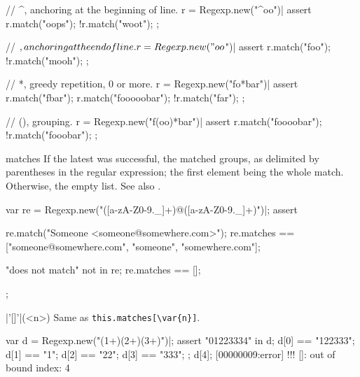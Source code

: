 \begin{urbiscriptapi}
\begin{urbiscript}
// ^, anchoring at the beginning of line.
r = Regexp.new("^oo")|
assert
{
  r.match("oops");
  !r.match("woot");
};

// $, anchoring at the end of line.
r = Regexp.new("oo$")|
assert
{
  r.match("foo");
  !r.match("mooh");
};

// *, greedy repetition, 0 or more.
r = Regexp.new("fo*bar")|
assert
{
  r.match("fbar");
  r.match("fooooobar");
  !r.match("far");
};

// (), grouping.
r = Regexp.new("f(oo)*bar")|
assert
{
  r.match("foooobar");
  !r.match("fooobar");
};
\end{urbiscript}

\item[matches]%
  If the latest  was successful, the matched groups, as
  delimited by parentheses in the regular expression; the first element
  being the whole match.  Otherwise, the empty list.  See also
  .

\begin{urbiscript}
var re = Regexp.new("([a-zA-Z0-9._]+)@([a-zA-Z0-9._]+)")|;
assert
{
  re.match("Someone <someone@somewhere.com>");
  re.matches == ["someone@somewhere.com", "someone", "somewhere.com"];

  "does not match" not in re;
  re.matches == [];
};
\end{urbiscript}

\item|'[]'|(<n>)%
  Same as \lstinline|this.matches[\var{n}]|.
\begin{urbiscript}
var d = Regexp.new("(1+)(2+)(3+)")|;
assert
{
  "01223334" in d;
  d[0] == "122333";
  d[1] == "1";
  d[2] == "22";
  d[3] == "333";
};
d[4];
[00000009:error] !!! []: out of bound index: 4
\end{urbiscript}

\end{urbiscriptapi}

